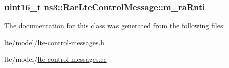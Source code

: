 \subsubsection[{\texorpdfstring{m\+\_\+ra\+Rnti}{m_raRnti}}]{\setlength{\rightskip}{0pt plus 5cm}uint16\+\_\+t ns3\+::\+Rar\+Lte\+Control\+Message\+::m\+\_\+ra\+Rnti\hspace{0.3cm}{\ttfamily [private]}}\hypertarget{classns3_1_1RarLteControlMessage_a80119fd25cdb6a3520ef43c25a7c9594}{}\label{classns3_1_1RarLteControlMessage_a80119fd25cdb6a3520ef43c25a7c9594}


The documentation for this class was generated from the following files\+:\begin{DoxyCompactItemize}
\item 
lte/model/\hyperlink{lte-control-messages_8h}{lte-\/control-\/messages.\+h}\item 
lte/model/\hyperlink{lte-control-messages_8cc}{lte-\/control-\/messages.\+cc}\end{DoxyCompactItemize}

